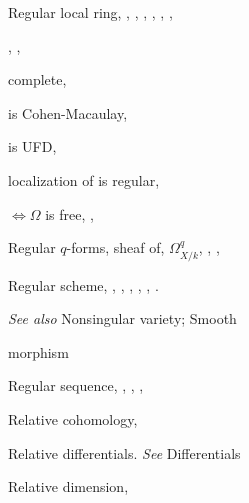 {{\noindent\hspace*{0.0bp}Regular local ring, , , , , , ,\par
\noindent\hspace*{15.0bp}, , \par
\noindent\hspace*{7.5bp}complete, \par
\noindent\hspace*{7.5bp}is Cohen-Macaulay, \par
\noindent\hspace*{7.5bp}is UFD, \par
\noindent\hspace*{7.5bp}localization of is regular, \par
\noindent\hspace*{7.5bp}$\Leftrightarrow\Omega$ is free, , \par
\noindent\hspace*{0.0bp}Regular $q$-forms, sheaf of, $\Omega^q_{X/k}$, , ,\par
\noindent\hspace*{15.0bp}\par
\noindent\hspace*{0.0bp}Regular scheme, , , , , , .\par
\noindent\hspace*{15.0bp}\emph{See also} Nonsingular variety; Smooth\par
\noindent\hspace*{15.0bp}morphism\par
\noindent\hspace*{0.0bp}Regular sequence, , , , \par
\noindent\hspace*{0.0bp}Relative cohomology, \par
\noindent\hspace*{0.0bp}Relative differentials. \emph{See} Differentials\par
\noindent\hspace*{0.0bp}Relative dimension, \par
}}
